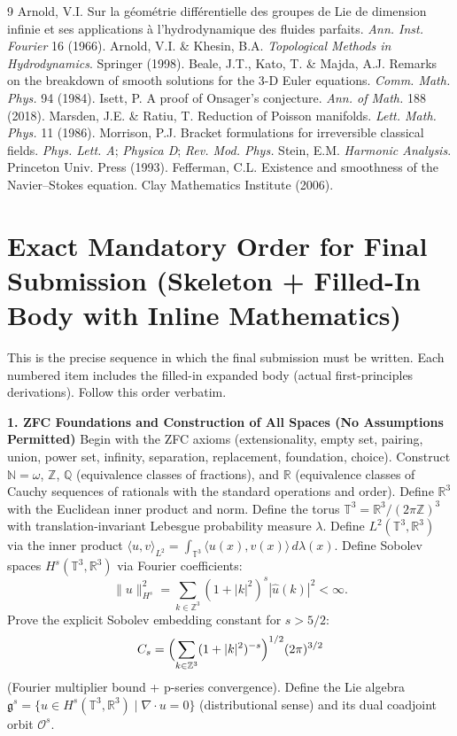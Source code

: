 \documentclass[11pt,a4paper]{article}
\begin{document}
\begin{thebibliography}{9}
 Arnold, V.I. Sur la g\'eom\'etrie diff\'erentielle des groupes de Lie de dimension infinie et ses applications \`a l'hydrodynamique des fluides parfaits. \emph{Ann. Inst. Fourier} 16 (1966).
 Arnold, V.I. \& Khesin, B.A. \emph{Topological Methods in Hydrodynamics}. Springer (1998).
 Beale, J.T., Kato, T. \& Majda, A.J. Remarks on the breakdown of smooth solutions for the 3-D Euler equations. \emph{Comm. Math. Phys.} 94 (1984).
 Isett, P. A proof of Onsager's conjecture. \emph{Ann. of Math.} 188 (2018).
 Marsden, J.E. \& Ratiu, T. Reduction of Poisson manifolds. \emph{Lett. Math. Phys.} 11 (1986).
 Morrison, P.J. Bracket formulations for irreversible classical fields. \emph{Phys. Lett. A}; \emph{Physica D}; \emph{Rev. Mod. Phys.}
 Stein, E.M. \emph{Harmonic Analysis}. Princeton Univ. Press (1993).
 Fefferman, C.L. Existence and smoothness of the Navier--Stokes equation. Clay Mathematics Institute (2006).
\end{thebibliography}

\appendix
\section{Exact Mandatory Order for Final Submission (Skeleton + Filled-In Body with Inline Mathematics)}

This is the precise sequence in which the final submission must be written. Each numbered item includes the filled-in expanded body (actual first-principles derivations). Follow this order verbatim.

\textbf{1. ZFC Foundations and Construction of All Spaces (No Assumptions Permitted)}  
Begin with the ZFC axioms (extensionality, empty set, pairing, union, power set, infinity, separation, replacement, foundation, choice). Construct \(\mathbb{N}=\omega\), \(\mathbb{Z}\), \(\mathbb{Q}\) (equivalence classes of fractions), and \(\mathbb{R}\) (equivalence classes of Cauchy sequences of rationals with the standard operations and order). Define \(\mathbb{R}^3\) with the Euclidean inner product and norm. Define the torus \(\mathbb{T}^3=\mathbb{R}^3/(2\pi\mathbb{Z})^3\) with translation-invariant Lebesgue probability measure \(\lambda\). Define \(L^2(\mathbb{T}^3,\mathbb{R}^3)\) via the inner product \(\langle u,v\rangle_{L^2}=\int_{\mathbb{T}^3}\langle u(x),v(x)\rangle\,d\lambda(x)\). Define Sobolev spaces \(H^s(\mathbb{T}^3,\mathbb{R}^3)\) via Fourier coefficients:  
\[
\|u\|_{H^s}^2=\sum_{k\in\mathbb{Z}^3}(1+|k|^2)^s|\hat{u}(k)|^2<\infty.
\]  
Prove the explicit Sobolev embedding constant for \(s>5/2\):  
\[
C_s=\Bigl(\sum_{k\in\mathbb{Z}^3}(1+|k|^2)^{-s}\Bigr)^{1/2}(2\pi)^{3/2}
\]  
(Fourier multiplier bound + p-series convergence). Define the Lie algebra \(\mathfrak{g}^s=\{u\in H^s(\mathbb{T}^3,\mathbb{R}^3)\mid\nabla\cdot u=0\}\) (distributional sense) and its dual coadjoint orbit \(\mathcal{O}^s\).
\end{document}
